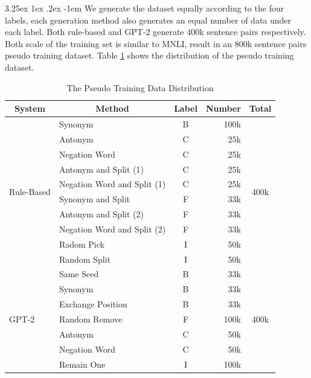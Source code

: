 \documentclass[12pt]{article}
\makeatletter
\renewcommand\paragraph{\@startsection{paragraph}{5}{\z@}%
  {3.25ex \@plus1ex \@minus.2ex}%
  {-1em}%
  {\normalfont\normalsize\bfseries}}
\makeatother
\begin{document}
\begin{CJK*}{UTF8}{bkai}
\begin{spacing}{1.77}
\paragraph{}
We generate the dataset equally according to the four labels, each generation method also generates an equal number of data under each label. Both rule-based and GPT-2 generate 400k sentence pairs respectively. Both scale of the training set is similar to MNLI, result in an 800k sentence pairs pseudo training dataset. Table \ref{table:pseudo_training_data_dist} shows the distribution of the pseudo training dataset.

\begin{table}[H]
  \centering
  \setlength{\extrarowheight}{-3pt}
  \begin{tabular}{|l|l|c|r|c|}
  \hline
  \multicolumn{1}{|c|}{System} & \multicolumn{1}{c|}{Method} & Label & \multicolumn{1}{c|}{Number} & Total \\ \hline
  \multirow{10}{*}{Rule-Based} & Synonym & B & 100k & \multirow{10}{*}{400k} \\ \cline{2-4}
   & Antonym & C & 25k &  \\ \cline{2-4}
   & Negation Word & C & 25k &  \\ \cline{2-4}
   & Antonym and Split (1) & C & 25k &  \\ \cline{2-4}
   & Negation Word and Split (1) & C & 25k &  \\ \cline{2-4}
   & Synonym and Split & F & 33k &  \\ \cline{2-4}
   & Antonym and Split (2) & F & 33k &  \\ \cline{2-4}
   & Negation Word and Split (2) & F & 33k &  \\ \cline{2-4}
   & Radom Pick & I & 50k &  \\ \cline{2-4}
   & Random Split & I & 50k &  \\ \hline
  \multirow{7}{*}{GPT-2} & Same Seed & B & 33k & \multirow{7}{*}{400k} \\ \cline{2-4}
   & Synonym & B & 33k &  \\ \cline{2-4}
   & Exchange Position & B & 33k &  \\ \cline{2-4}
   & Random Remove & F & 100k &  \\ \cline{2-4}
   & Antonym & C & 50k &  \\ \cline{2-4}
   & Negation Word & C & 50k &  \\ \cline{2-4}
   & Remain One & I & 100k &  \\ \hline
  \end{tabular}
  \caption{The Pseudo Training Data Distribution}
  \label{table:pseudo_training_data_dist}
\end{table}


\end{spacing}
\end{CJK*}
\end{document}
